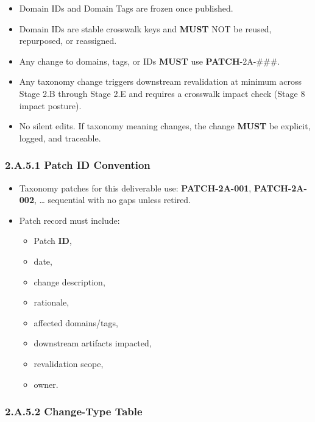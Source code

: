 \documentclass[10pt]{article}
\begin{document}
\begin{itemize}
\item Domain IDs and Domain Tags are frozen once published.
\item Domain IDs are stable crosswalk keys and \textbf{MUST} NOT be reused, repurposed, or reassigned.
\item Any change to domains, tags, or IDs \textbf{MUST} use \textbf{PATCH}-2A-\#\#\#.
\item Any taxonomy change triggers downstream revalidation at minimum across Stage 2.B through Stage 2.E and requires a crosswalk impact check (Stage 8 impact posture).
\item No silent edits. If taxonomy meaning changes, the change \textbf{MUST} be explicit, logged, and traceable.
\end{itemize}

\subsubsection*{2.A.5.1 Patch \textbf{ID} Convention}

\begin{itemize}
\item Taxonomy patches for this deliverable use: \textbf{PATCH-2A-001}, \textbf{PATCH-2A-002}, … sequential with no gaps unless retired.
\item Patch record must include:
  \begin{itemize}
  \item Patch \textbf{ID},
  \item date,
  \item change description,
  \item rationale,
  \item affected domains/tags,
  \item downstream artifacts impacted,
  \item revalidation scope,
  \item owner.
  \end{itemize}
\end{itemize}

\subsubsection*{2.A.5.2 Change-Type Table}

\begingroup
\scriptsize
\setlength{\tabcolsep}{2pt}
\renewcommand{\arraystretch}{1.12}
\end{document}
